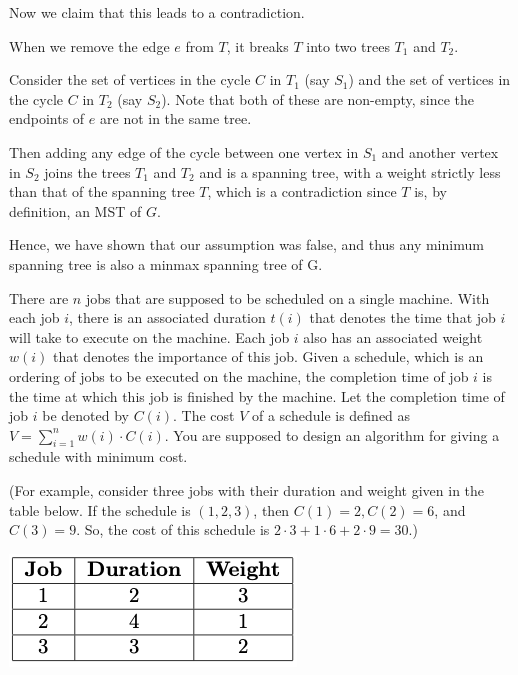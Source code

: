 \documentclass[answers]{exam}
\begin{document}
\begin{questions}
\begin{solution}
        Now we claim that this leads to a contradiction.

        When we remove the edge $e$ from $T$, it breaks $T$ into two trees $T_1$ and $T_2$.

        Consider the set of vertices in the cycle $C$ in $T_1$ (say $S_1$) and the set of vertices in the cycle $C$ in $T_2$ (say $S_2$). Note that both of these are non-empty, since the endpoints of
        $e$ are not in the same tree.

        Then adding any edge of the cycle between one vertex in $S_1$ and another vertex in $S_2$ joins the trees $T_1$ and $T_2$ and is a spanning tree, with a weight strictly less than that of the
        spanning tree $T$, which is a contradiction since $T$ is, by definition, an MST of $G$.

        Hence, we have shown that our assumption was false, and thus any minimum spanning tree is also a minmax spanning tree of G.

    \end{solution}

\question[7]
        There are $n$ jobs that are supposed to be scheduled on a single machine. With each job $i$, there is an associated duration $t(i)$ that denotes the time that job $i$ will take to execute on
        the machine. Each job $i$ also has an associated weight $w(i)$ that denotes the importance of this job. Given a schedule, which is an ordering of jobs to be executed on the machine, the
        completion time of job $i$ is the time at which this job is finished by the machine. Let the completion time of job $i$ be denoted by $C(i)$. The cost $V$ of a schedule is defined as $V =
        \sum_{i=1}^{n} w(i) \cdot C(i)$. You are supposed to design an algorithm for giving a schedule with minimum cost.

        (For example, consider three jobs with their duration and weight given in the table below. If the schedule is $(1, 2, 3)$, then $C(1) = 2, C(2) = 6$, and $C(3) = 9$. So, the cost of this
        schedule is $2 \cdot 3 + 1 \cdot 6 + 2 \cdot 9 = 30$.)

        \begin{center}
        \includegraphics{img/table.png}
        \end{center}


\end{questions}
\end{document}
